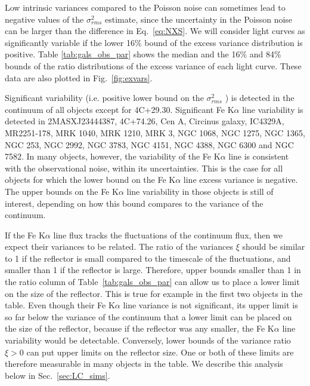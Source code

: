 Low intrinsic variances compared to the Poisson noise can sometimes lead to negative values of the $\sigma^2_{rms}$ estimate, since the uncertainty in the Poisson noise can be larger than the difference in Eq.~\ref{eq:NXS}. We will consider light curves as significantly variable if the lower 16\% bound of the excess variance distribution is positive. Table \ref{tab:gals_obs_par} shows the median and the 16\% and 84\% bounds of the ratio distributions of the excess variance of each light curve. These data are also plotted in Fig.~\ref{fig:exvars}. 

Significant variability (i.e. positive lower bound on the $\sigma^2_{rms}$ ) is detected in the continuum of all objects except for 4C+29.30.  Significant Fe K$\alpha$ line variability is detected in 2MASXJ23444387, 4C+74.26, Cen A, Circinus galaxy, IC4329A, MR2251-178, MRK 1040, MRK 1210, MRK 3, NGC 1068, NGC 1275, NGC 1365, NGC 253, NGC 2992, NGC 3783, NGC 4151, NGC 4388, NGC 6300 and NGC 7582. In many objects, however, the variability of the Fe K$\alpha$ line is consistent with the observational noise, within its uncertainties. This is the case for all objects for which the lower bound on the Fe K$\alpha$ line excess variance is negative. The upper bounds on the Fe K$\alpha$ line variability in those objects is still of interest, depending on how this bound compares to the variance of the continuum.

If the Fe K$\alpha$ line flux tracks the fluctuations of the continuum flux, then we expect their variances to be related. The ratio of the variances $\xi$ should be similar to 1 if the reflector is small compared to the timescale of the fluctuations, and smaller than 1 if the reflector is large. Therefore, upper bounds smaller than 1 in the ratio column of Table~\ref{tab:gals_obs_par} can allow us to place a lower limit on the size of the reflector. This is true for example in the first two objects in the table. Even though their Fe K$\alpha$ line variance is not significant, its upper limit is so far below the variance of the continuum that a lower limit can be placed on the size of the reflector, because if the reflector was any smaller, the Fe K$\alpha$ line variability would be detectable. Conversely, lower bounds of the variance ratio $\xi>0$ can put upper limits on the reflector size. One or both of these limits are therefore measurable in many objects in the table. We describe this analysis below in Sec.~\ref{sec:LC_sims}.

